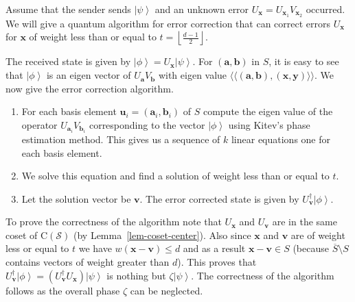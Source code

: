 \documentclass[11pt,twoside]{article}
\theoremstyle{definition}
\theoremstyle{remark}
\newcommand{\Weight}[1]{\ensuremath{w\left(#1\right)}}
\newcommand{\ket}[1]{\ensuremath{\left\vert #1 \right\rangle}}
\newcommand{\Centre}[1]{\ensuremath{\mathrm{C}\left(#1\right)}}
\newcommand{\Symp}[2]{\ensuremath{\langle\langle #1, #2 \rangle \rangle}}
\begin{document}
Assume that the sender sends $\ket{\psi}$ and an unknown error
$U_\mathbf{x} = U_{\mathbf{x}_1}V_{\mathbf{x}_2}$ occurred. We will
give a quantum algorithm for error correction that can correct errors
$U_\mathbf{x}$ for $\mathbf{x}$ of weight less than or equal to $t =
\left\lfloor\frac{d -1}{2} \right\rfloor$.

The received state is given by $\ket{\phi} = U_\mathbf{x} \ket{\psi}$.
For $(\mathbf{a},\mathbf{b})$ in $S$, it is easy to see that
$\ket{\phi}$ is an eigen vector of $U_\mathbf{a}V_\mathbf{b}$ with
eigen value $\Symp{(\mathbf{a},\mathbf{b})}{(\mathbf{x},\mathbf{y})}$.
We now give the error correction algorithm.

\begin{enumerate}
\item For each basis element $\mathbf{u}_i =
  (\mathbf{a}_i,\mathbf{b}_i)$ of $S$ compute the eigen value of the
  operator $U_{\mathbf{a}_i}V_{\mathbf{b}_i}$ corresponding to the
  vector $\ket{\phi}$ using Kitev's phase estimation method.  This
  gives us a sequence of $k$ linear equations one for each basis
  element.
\item We solve this equation and find a solution of weight less than
  or equal to $t$.
\item Let the solution vector be $\mathbf{v}$.  The error corrected
  state is given by $U_\mathbf{v}^\dag \ket{\phi}$.
\end{enumerate}

To prove the correctness of the algorithm note that $U_\mathbf{x}$ and
$U_\mathbf{v}$ are in the same coset of $\Centre{\mathcal{S}}$ (by
Lemma~\ref{lem-coset-center}). Also since $\mathbf{x}$ and
$\mathbf{v}$ are of weight less or equal to $t$ we have
$\Weight{\mathbf{x} - \mathbf{v}} \leq d$ and as a result $\mathbf{x}
- \mathbf{v} \in S$ (because $\overline{S} \setminus S$ contains
vectors of weight greater than $d$). This proves that
$U_{\mathbf{v}}^\dag \ket{\phi} = (U_{\mathbf{v}}^\dag U_\mathbf{x})
\ket{\psi}$ is nothing but $\zeta \ket{\psi}$. The correctness of the
algorithm follows as the overall phase $\zeta$ can be neglected.
 
% 
%
\end{document}
